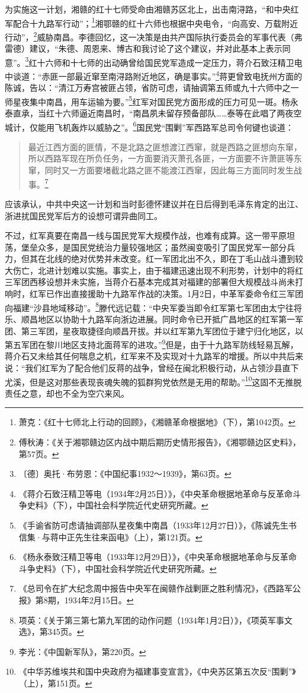 为实施这一计划，湘赣的红十七师受命由湘赣苏区北上，出击南浔路，“和中央红军配合十九路军行动”；\footnote{萧克：《红十七师北上行动的回顾》，《湘赣革命根据地》（下），第1042页。}湘鄂赣的红十六师也根据中央电令，“向高安、万载附近行动”，\footnote{傅秋涛：《关于湘鄂赣边区内战中期后期历史情形报告》，《湘鄂赣边区史料》，第57页。}威胁南昌。李德回忆，这一决策是由共产国际执行委员会的军事代表（弗雷德）建议，“朱德、周恩来、博古和我讨论了这个建议，并对此基本上表示同意”。\footnote{〔德〕奥托·布劳恩：《中国纪事1932～1939》，第63页。}红十六师和十七师的出动确曾给国民党军造成一定压力，蒋介石致汪精卫电中谈道：“赤匪一部最近窜至南浔路附近地区，确是事实。”\footnote{《蒋介石致汪精卫等电（1934年2月25日）》，《中央革命根据地革命与反革命斗争史料》（下），中国社会科学院近代史研究所藏。}蒋更曾致电抚州方面的陈诚，告以：“清江万寿宫被匪占领，省防可虑，请抽调第五师或九十六师中之一师星夜集中南昌，用车运输为要。”\footnote{《手谕省防可虑请抽调部队星夜集中南昌（1933年12月27日）》，《陈诚先生书信集·与蒋中正先生往来函电》（上），第121页。}红军对国民党方面形成的压力可见一斑。杨永泰直承，当红十六师逼近南昌时，“南昌夙未留存预备部队……泰等在此唱了两夜空城计，仅能用飞机轰炸以威胁之”。\footnote{《杨永泰致汪精卫等电（1933年12月29日）》，《中央革命根据地革命与反革命斗争史料》（下），中国社会科学院近代史研究所藏。}国民党“围剿”军西路军总司令何键也谈道：

\begin{quote}

最近江西方面的匪情，不是北路之匪想渡江西窜，就是西路之匪想向东窜，所以西路军现在所负任务，一方面要消灭萧孔各匪，一方面要不许萧匪等东窜，同时又一方面要堵截北路之匪不能渡江西窜，因此每三方面同时发生战事。\footnote{《总司令在扩大纪念周中报告中央军在闽赣作战剿匪之胜利情况》，《西路军公报》第8期，1934年2月15日。}
\end{quote}


应该承认，中共中央这一计划和当时彭德怀建议并在日后得到毛泽东肯定的出江、浙进扰国民党军后方的设想可谓异曲同工。


不过，红军真要在南昌一线与国民党军大规模作战，也难有成算。这一带平原坦荡，堡垒众多，是国民党统治力量较强地区；虽然闽变吸引了国民党军一部分兵力，但其在北线的绝对优势并未改变。红一军团北出不久，即在丁毛山战斗遭到较大伤亡，北进计划难以实施。事实上，由于福建迅速出现不利形势，计划中的将红三军团西移设想并未实施，当蒋介石基本完成其对福建的部署但大规模战斗尚未打响时，红军已作出直接援助十九路军作战的决策。1月2日，中革军委命令红三军团向福建“沙县地域移动”。\footnote{项英：《关于第三第七第九军团的动作问题（1934年1月2日）》，《项英军事文选》，第345页。}滕代远记载：“中央军委当即令红军第七军团由太宁往将乐、顺昌地区以协助十九路军向浙边进展。同时命令已开抵广昌地区的红军第一军团、第三军团，星夜取捷径向顺昌开拔。并以红军第九军团位于建宁归化地区，以第五军团在黎川地区支持北面蒋军的进攻。”\footnote{李光：《中国新军队》，第220页。}但是，由于十九路军防线轻易瓦解，蒋介石又未给其任何喘息之机，红军来不及实现对十九路军的增援。所以中共后来说：“我们红军为了配合他们反蒋的战争，曾经在闽北积极行动，从占领沙县直下尤溪，但是这对那些表现丧魂失魄的狐群狗党依然是无用的帮助。”\footnote{《中华苏维埃共和国中央政府为福建事变宣言》，《中央苏区第五次反“围剿”》（上），第151页。}这固不无推脱责任之意，却也不全为空穴来风。


